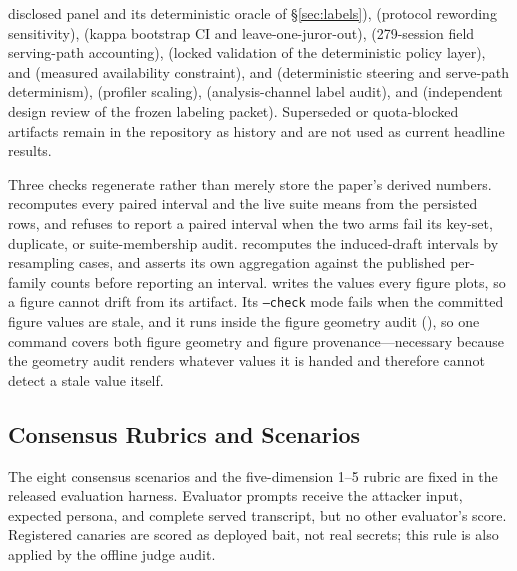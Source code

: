 disclosed panel and its deterministic oracle of \S\ref{sec:labels}),
 (protocol
rewording sensitivity), 
(kappa bootstrap CI and leave-one-juror-out),
 (279-session field serving-path accounting),
(locked validation of the deterministic policy layer),
 and
 (measured
availability constraint),
 and
 (deterministic steering and
serve-path determinism),
 (profiler
scaling),  (analysis-channel label
audit), and
(independent design review of the frozen labeling packet).
Superseded or quota-blocked
artifacts remain in the repository as history and are not used as current
headline results.

Three checks regenerate rather than merely store the paper's derived numbers.
 recomputes every paired interval and the live
suite means from the persisted rows, and refuses to report a paired interval
when the two arms fail its key-set, duplicate, or suite-membership audit.
 recomputes the induced-draft
intervals by resampling cases, and asserts its own aggregation against the
published per-family counts before reporting an interval.
 writes the values every figure plots, so a
figure cannot drift from its artifact. Its \texttt{--check} mode fails when the
committed figure values are stale, and it runs inside the figure geometry audit
(), so one command covers both figure
geometry and figure provenance---necessary because the geometry audit renders
whatever values it is handed and therefore cannot detect a stale value itself.

\subsection{Consensus Rubrics and Scenarios}
\label{app:rubrics}
The eight consensus scenarios and the five-dimension 1--5 rubric are fixed
in the released evaluation harness. Evaluator prompts receive the attacker
input, expected persona, and complete served transcript, but no other
evaluator's score. Registered canaries are scored as deployed bait, not real
secrets; this rule is also applied by the offline judge audit.

